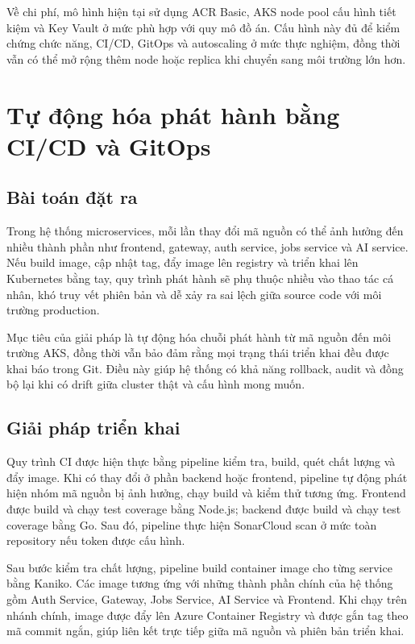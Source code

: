 \documentclass[../DoAn.tex]{subfiles}
\begin{document}
Về chi phí, mô hình hiện tại sử dụng ACR Basic, AKS node pool cấu hình tiết kiệm và Key Vault ở mức phù hợp với quy mô đồ án. Cấu hình này đủ để kiểm chứng chức năng, CI/CD, GitOps và autoscaling ở mức thực nghiệm, đồng thời vẫn có thể mở rộng thêm node hoặc replica khi chuyển sang môi trường lớn hơn.

\section{Tự động hóa phát hành bằng CI/CD và GitOps}
\label{sec:solution-cicd-gitops}

\subsection{Bài toán đặt ra}

Trong hệ thống microservices, mỗi lần thay đổi mã nguồn có thể ảnh hưởng đến nhiều thành phần như frontend, gateway, auth service, jobs service và AI service. Nếu build image, cập nhật tag, đẩy image lên registry và triển khai lên Kubernetes bằng tay, quy trình phát hành sẽ phụ thuộc nhiều vào thao tác cá nhân, khó truy vết phiên bản và dễ xảy ra sai lệch giữa source code với môi trường production.

Mục tiêu của giải pháp là tự động hóa chuỗi phát hành từ mã nguồn đến môi trường AKS, đồng thời vẫn bảo đảm rằng mọi trạng thái triển khai đều được khai báo trong Git. Điều này giúp hệ thống có khả năng rollback, audit và đồng bộ lại khi có drift giữa cluster thật và cấu hình mong muốn.

\subsection{Giải pháp triển khai}

Quy trình CI được hiện thực bằng pipeline kiểm tra, build, quét chất lượng và đẩy image. Khi có thay đổi ở phần backend hoặc frontend, pipeline tự động phát hiện nhóm mã nguồn bị ảnh hưởng, chạy build và kiểm thử tương ứng. Frontend được build và chạy test coverage bằng Node.js; backend được build và chạy test coverage bằng Go. Sau đó, pipeline thực hiện SonarCloud scan ở mức toàn repository nếu token được cấu hình.

Sau bước kiểm tra chất lượng, pipeline build container image cho từng service bằng Kaniko. Các image tương ứng với những thành phần chính của hệ thống gồm Auth Service, Gateway, Jobs Service, AI Service và Frontend. Khi chạy trên nhánh chính, image được đẩy lên Azure Container Registry và được gắn tag theo mã commit ngắn, giúp liên kết trực tiếp giữa mã nguồn và phiên bản triển khai.
\end{document}

